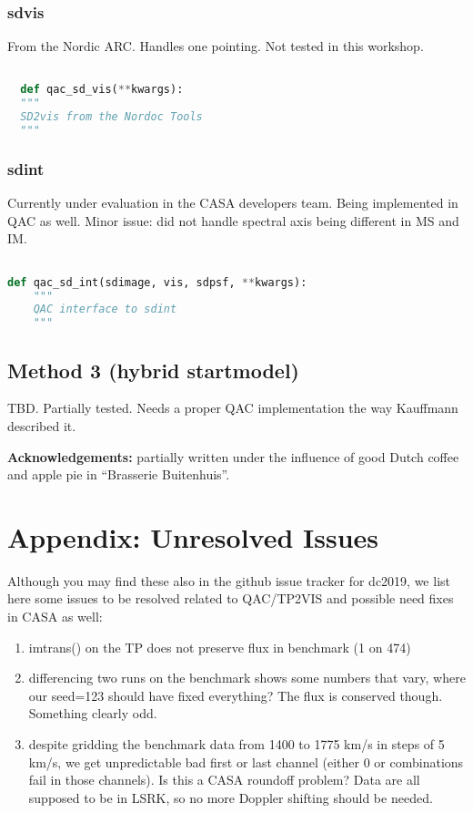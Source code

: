 \documentclass[12pt,a4paper]{article}
\begin{document}
\subsubsection{sdvis}

From the Nordic ARC. Handles one pointing. Not tested in this workshop.

\begin{lstlisting}[language=Python]

  def qac_sd_vis(**kwargs):
  """
  SD2vis from the Nordoc Tools
  """

\end{lstlisting}


\subsubsection{sdint}

Currently under evaluation in the CASA developers team.  Being implemented in QAC as well.
Minor issue: did not handle spectral axis being different in MS and IM.

\begin{lstlisting}[language=Python]

def qac_sd_int(sdimage, vis, sdpsf, **kwargs):
    """
    QAC interface to sdint
    """


\end{lstlisting}


\subsection{Method 3 (hybrid startmodel)}

TBD. Partially tested. Needs a proper QAC implementation the way Kauffmann described it.

\bigskip
{\bf Acknowledgements:} partially written under the influence of good Dutch coffee and apple pie in ``Brasserie Buitenhuis''.

\clearpage
\section{Appendix: Unresolved Issues}

Although you may find these also in the github issue tracker for dc2019, we list here some issues to be resolved related to QAC/TP2VIS
and possible need fixes in CASA as well:

\begin{enumerate}

\item imtrans() on the TP does not preserve flux in benchmark (1 on 474)
\item differencing two runs on the benchmark shows some numbers that vary, where our seed=123 should have fixed everything?
  The flux is conserved though. Something clearly odd.
\item despite gridding the benchmark data from 1400 to 1775 km/s in steps of 5 km/s, we get unpredictable bad first or last channel
  (either 0 or combinations fail in those channels). Is this a CASA roundoff problem?  Data are all supposed to be in LSRK, so no more
  Doppler shifting should be needed.
  
\end{enumerate}
\end{document}
